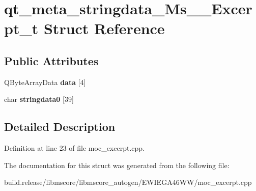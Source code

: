 \hypertarget{structqt__meta__stringdata___ms_____excerpt__t}{}\section{qt\+\_\+meta\+\_\+stringdata\+\_\+\+Ms\+\_\+\+\_\+\+Excerpt\+\_\+t Struct Reference}
\label{structqt__meta__stringdata___ms_____excerpt__t}
\subsection*{Public Attributes}
\begin{DoxyCompactItemize}
\item 
\mbox{\label{structqt__meta__stringdata___ms_____excerpt__t_ae45c2a9f911d539d62ae554e4d66acc7}} 
Q\+Byte\+Array\+Data {\bfseries data} \mbox{[}4\mbox{]}
\item 
\mbox{\label{structqt__meta__stringdata___ms_____excerpt__t_a3dd071d0f5c4a6a9a136628772257633}} 
char {\bfseries stringdata0} \mbox{[}39\mbox{]}
\end{DoxyCompactItemize}


\subsection{Detailed Description}


Definition at line 23 of file moc\+\_\+excerpt.\+cpp.



The documentation for this struct was generated from the following file\+:\begin{DoxyCompactItemize}
\item 
build.\+release/libmscore/libmscore\+\_\+autogen/\+E\+W\+I\+E\+G\+A46\+W\+W/moc\+\_\+excerpt.\+cpp\end{DoxyCompactItemize}

